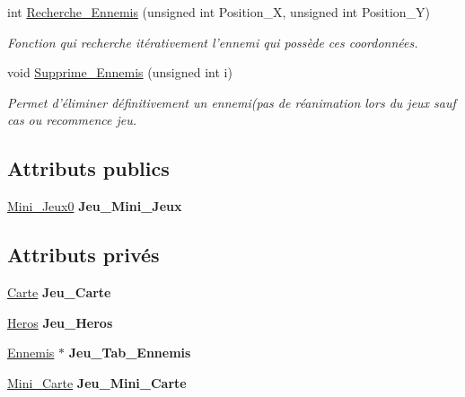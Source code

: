 \begin{DoxyCompactItemize}
\item 
\hypertarget{classJeu_ad6de5bb04656570f3a4168728566e15c}{int \hyperlink{classJeu_ad6de5bb04656570f3a4168728566e15c}{Recherche\+\_\+\+Ennemis} (unsigned int Position\+\_\+\+X, unsigned int Position\+\_\+\+Y)}\label{classJeu_ad6de5bb04656570f3a4168728566e15c}

\begin{DoxyCompactList}\small\item\em Fonction qui recherche itérativement l'ennemi qui possède ces coordonnées. \end{DoxyCompactList}\item 
\hypertarget{classJeu_a42deab2df34ecd40004f70aec777bf0b}{void \hyperlink{classJeu_a42deab2df34ecd40004f70aec777bf0b}{Supprime\+\_\+\+Ennemis} (unsigned int i)}\label{classJeu_a42deab2df34ecd40004f70aec777bf0b}

\begin{DoxyCompactList}\small\item\em Permet d'éliminer définitivement un ennemi(pas de réanimation lors du jeux sauf cas ou recommence jeu. \end{DoxyCompactList}\end{DoxyCompactItemize}
\subsection*{Attributs publics}
\begin{DoxyCompactItemize}
\item 
\hypertarget{classJeu_a542e022ef9c8f5de525d553ab5c2c4b5}{\hyperlink{classMini__Jeux0}{Mini\+\_\+\+Jeux0} {\bfseries Jeu\+\_\+\+Mini\+\_\+\+Jeux}}\label{classJeu_a542e022ef9c8f5de525d553ab5c2c4b5}

\end{DoxyCompactItemize}
\subsection*{Attributs privés}
\begin{DoxyCompactItemize}
\item 
\hypertarget{classJeu_a653e9003649e8e52a97b7bb0687dbb45}{\hyperlink{classCarte}{Carte} {\bfseries Jeu\+\_\+\+Carte}}\label{classJeu_a653e9003649e8e52a97b7bb0687dbb45}

\item 
\hypertarget{classJeu_af74402ca4ee6eeadd483a1576db1662a}{\hyperlink{classHeros}{Heros} {\bfseries Jeu\+\_\+\+Heros}}\label{classJeu_af74402ca4ee6eeadd483a1576db1662a}

\item 
\hypertarget{classJeu_a42766cc97bc1fbc987f36c3eb7d6664c}{\hyperlink{classEnnemis}{Ennemis} $\ast$ {\bfseries Jeu\+\_\+\+Tab\+\_\+\+Ennemis}}\label{classJeu_a42766cc97bc1fbc987f36c3eb7d6664c}

\item 
\hypertarget{classJeu_a9ca8a3168105db0f97b725a9c0e59067}{\hyperlink{classMini__Carte}{Mini\+\_\+\+Carte} {\bfseries Jeu\+\_\+\+Mini\+\_\+\+Carte}}\label{classJeu_a9ca8a3168105db0f97b725a9c0e59067}

\end{DoxyCompactItemize}


